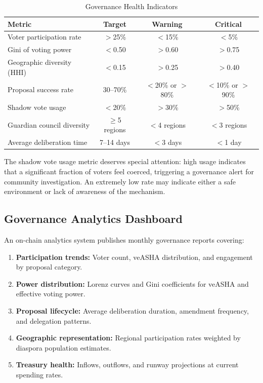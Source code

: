 \documentclass[11pt,a4paper]{article}
\begin{document}
\begin{table}[H]
\centering
\caption{Governance Health Indicators}
\label{tab:health}
\begin{tabular}{lccc}
\toprule
\textbf{Metric} & \textbf{Target} & \textbf{Warning} & \textbf{Critical} \\
\midrule
Voter participation rate & $>$25\% & $<$15\% & $<$5\% \\
Gini of voting power & $<$0.50 & $>$0.60 & $>$0.75 \\
Geographic diversity (HHI) & $<$0.15 & $>$0.25 & $>$0.40 \\
Proposal success rate & 30--70\% & $<$20\% or $>$80\% & $<$10\% or $>$90\% \\
Shadow vote usage & $<$20\% & $>$30\% & $>$50\% \\
Guardian council diversity & $\geq$5 regions & $<$4 regions & $<$3 regions \\
Average deliberation time & 7--14 days & $<$3 days & $<$1 day \\
\bottomrule
\end{tabular}
\end{table}

The shadow vote usage metric deserves special attention: high usage indicates that a significant fraction of voters feel coerced, triggering a governance alert for community investigation. An extremely low rate may indicate either a safe environment or lack of awareness of the mechanism.

\subsection{Governance Analytics Dashboard}

An on-chain analytics system publishes monthly governance reports covering:

\begin{enumerate}
    \item \textbf{Participation trends:} Voter count, veASHA distribution, and engagement by proposal category.
    \item \textbf{Power distribution:} Lorenz curves and Gini coefficients for veASHA and effective voting power.
    \item \textbf{Proposal lifecycle:} Average deliberation duration, amendment frequency, and delegation patterns.
    \item \textbf{Geographic representation:} Regional participation rates weighted by diaspora population estimates.
    \item \textbf{Treasury health:} Inflows, outflows, and runway projections at current spending rates.
\end{enumerate}
\end{document}
